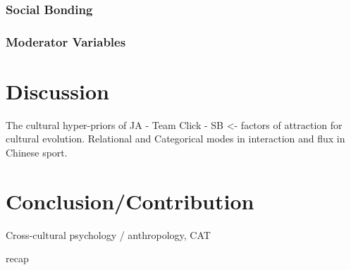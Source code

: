     \subsubsection{Social Bonding}












    \subsubsection{Moderator Variables}






























  \section{Discussion}



  The cultural hyper-priors of JA - Team Click - SB <- factors of attraction for cultural evolution.
  Relational and Categorical modes in interaction and flux in Chinese sport.






  \section{Conclusion/Contribution}
  Cross-cultural psychology / anthropology, CAT

  recap
